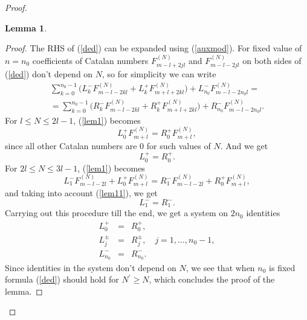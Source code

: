 \documentclass[11pt]{amsart}
\newtheorem{lemma}[theorem]{Lemma}
\begin{document}
\begin{proof}
\begin{lemma}
	\end{lemma}
	\begin{proof}
		The RHS of (\ref{ded}) can be expanded using (\ref{auxmod}). For fixed value of $n=n_0$ coefficients of Catalan numbers $F^{(N)}_{m-l+2jl}$ and $F^{(N)}_{m-l-2jl}$ on both sides of (\ref{ded}) don't depend on $N$, so for simplicity we can write
		\begin{eqnarray}\label{lem1}
		\sum_{k=0}^{n_0-1}\big(L^{-}_kF^{(N)}_{m-l-2kl}+L^{+}_k F^{(N)}_{m+l+2kl}\big)+L^{-}_{n_0}F^{(N)}_{m-l-2n_0l}=\\
  =\sum_{k=0}^{n_0-1}\big(R^{-}_kF^{(N)}_{m-l-2kl}+R^{+}_k F^{(N)}_{m+l+2kl}\big)+R^{-}_{n_0}F^{(N)}_{m-l-2n_0l}.\nonumber
		\end{eqnarray}
		For $l\leq N\leq 2l-1$, (\ref{lem1}) becomes
		\begin{equation*}
		L^{+}_0F^{(N)}_{m+l}=R^{+}_0F^{(N)}_{m+l},
		\end{equation*}
		since all other Catalan numbers are $0$ for such values of $N$. And we get
		\begin{equation}\label{lem11}
		L^{+}_0=R^{+}_0.
		\end{equation}
		For $2l\leq N\leq 3l-1$, (\ref{lem1}) becomes
		\begin{equation*}
		L^{-}_1F^{(N)}_{m-l-2l}+L^{+}_0 F^{(N)}_{m+l}=R^{-}_1F^{(N)}_{m-l-2l}+R^{+}_0 F^{(N)}_{m+l},
		\end{equation*}
		and taking into account (\ref{lem11}), we get
		\begin{equation*}
		L^{-}_1=R^{-}_1.
		\end{equation*}
		Carrying out this procedure till the end, we get a system on $2n_0$ identities
		\begin{eqnarray*}
		L^{+}_0 &=& R^{+}_0,\\
		L^{\pm}_j &=& R^{\pm}_j,\quad j=1,\ldots, n_0-1,\\
		L^{-}_{n_0} &=& R^{-}_{n_0}.
		\end{eqnarray*}
		Since identities in the system don't depend on $N$, we see that when $n_0$ is fixed formula (\ref{ded}) should hold for $N^\prime\geq N$, which concludes the proof of the lemma.
	\end{proof}\par
	

\end{proof}
\end{document}
